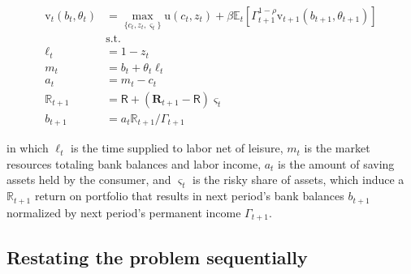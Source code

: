 \documentclass{article}
\newcommand{\DiscFac}{\beta}
\newcommand{\utilFunc}{\mathrm{u}}
\newcommand{\util}{u}
\newcommand{\tShkEmp}{\theta}
\newcommand{\Ex}{\mathbb{E}}
\newcommand{\CRRA}{\rho}
\newcommand{\h}{h}
\newcommand{\bRat}{b}
\newcommand{\leisure}{z}
\newcommand{\cRat}{c}
\newcommand{\vFunc}{\mathrm{v}}
\newcommand{\Rfree}{\mathsf{R}}
\newcommand{\riskyshare}{\varsigma}
\newcommand{\PGro}{\Gamma}
\newcommand{\labor}{\ell}
\newcommand{\aRat}{a}
\newcommand{\mRat}{m}
\newcommand{\Rport}{\mathbb{R}}
\newcommand{\Risky}{\mathbf{R}}
\newcommand{\vEnd}{\mathfrak{v}}
\begin{document}
\begin{equation}
\begin{split}
    \vFunc_{t}(\bRat_{t}, \tShkEmp_{t}) & = \max_{\{\cRat_{t},
      \leisure_{t}, \riskyshare_{t}\}} \utilFunc(\cRat_{t}, \leisure_{t}) +
    \DiscFac \Ex_{t} \left[ \PGro_{t+1}^{1-\CRRA}
      \vFunc_{t+1} (\bRat_{t+1},
      \tShkEmp_{t+1}) \right] \\
    & \text{s.t.} \\
    \labor_{t} & = 1 - \leisure_{t} \\
    \mRat_{t} & = \bRat_{t} + \tShkEmp_{t}\labor_{t} \\
    \aRat_{t} & = \mRat_{t} - \cRat_{t} \\
    \Rport_{t+1} & = \Rfree + (\Risky_{t+1} - \Rfree)
    \riskyshare_{t} \\
    \bRat_{t+1} & = \aRat_{t} \Rport_{t+1} / \PGro_{t+1}
  \end{split}
\end{equation}

in which $\labor_{t}$ is the time supplied to labor net of leisure, $\mRat_{t}$ is the market resources totaling bank balances and labor income, $\aRat_{t}$ is the amount of saving assets held by the consumer, and $\riskyshare_{t}$ is the risky share of assets, which induce a $\Rport_{t+1}$ return on portfolio that results in next period's bank balances $\bRat_{t+1}$ normalized by next period's permanent income $\PGro_{t+1}$.


\subsection{Restating the problem sequentially}\label{Restating the problem sequentially}
\end{document}
